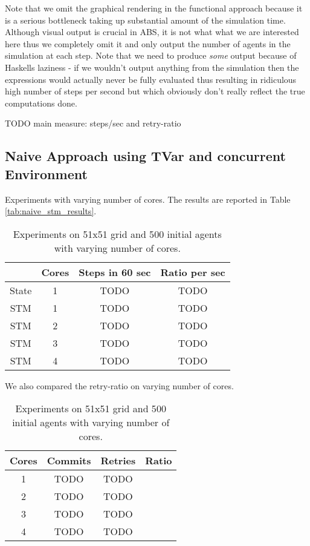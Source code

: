 Note that we omit the graphical rendering in the functional approach because it is a serious bottleneck taking up substantial amount of the simulation time. Although visual output is crucial in ABS, it is not what what we are interested here thus we completely omit it and only output the number of agents in the simulation at each step. Note that we need to produce \textit{some} output because of Haskells laziness - if we wouldn't output anything from the simulation then the expressions would actually never be fully evaluated thus resulting in ridiculous high number of steps per second but which obviously don't really reflect the true computations done.

TODO main measure: steps/sec and retry-ratio

\subsection{Naive Approach using TVar and concurrent Environment}
Experiments with varying number of cores. The results are reported in Table \ref{tab:naive_stm_results}.

\begin{table}
	\centering
  	\begin{tabular}{ c || c | c | c }
               & Cores & Steps in 60 sec & Ratio per sec \\ \hline \hline 
    	State  & 1     & TODO   & TODO   \\ \hline \hline
   		STM    & 1     & TODO   & TODO   \\ \hline
   		STM    & 2     & TODO            & TODO      \\ \hline
   		STM    & 3     & TODO            & TODO      \\ \hline
   		STM    & 4     & TODO            & TODO      \\ \hline \hline
   	\end{tabular}
  	
  	\caption{Experiments on 51x51 grid and 500 initial agents with varying number of cores.}
	\label{tab:naive_results_time}
\end{table}

We also compared the retry-ratio on varying number of cores.

\begin{table}
	\centering
  	\begin{tabular}{ c || c | c | c }
        Cores & Commits & Retries & Ratio \\ \hline \hline 
    	1     & TODO              & TODO  \\ \hline \hline
   		2     & TODO              & TODO  \\ \hline
   		3     & TODO              & TODO      \\ \hline
   		4     & TODO              & TODO      \\ \hline
   	\end{tabular}
  	
  	\caption{Experiments on 51x51 grid and 500 initial agents with varying number of cores.}
	\label{tab:naive_results_retries}
\end{table}


